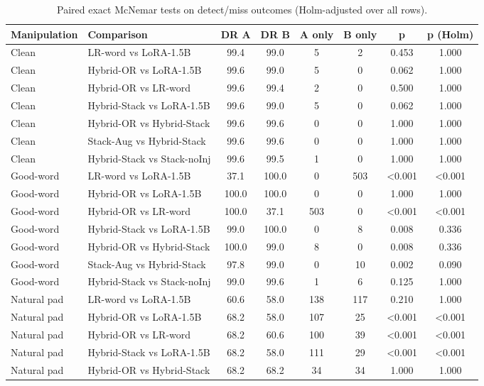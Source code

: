 \begin{table}[t]
\centering
\caption{Paired exact McNemar tests on detect/miss outcomes (Holm-adjusted over all rows).}
\label{tab:mcnemar}
\footnotesize
\begin{tabular}{llcccccc}
\toprule
\textbf{Manipulation} & \textbf{Comparison} & \textbf{DR A} & \textbf{DR B} & \textbf{A only} & \textbf{B only} & \textbf{p} & \textbf{p (Holm)} \\
\midrule
Clean & LR-word vs LoRA-1.5B & 99.4 & 99.0 & 5 & 2 & 0.453 & 1.000 \\
Clean & Hybrid-OR vs LoRA-1.5B & 99.6 & 99.0 & 5 & 0 & 0.062 & 1.000 \\
Clean & Hybrid-OR vs LR-word & 99.6 & 99.4 & 2 & 0 & 0.500 & 1.000 \\
Clean & Hybrid-Stack vs LoRA-1.5B & 99.6 & 99.0 & 5 & 0 & 0.062 & 1.000 \\
Clean & Hybrid-OR vs Hybrid-Stack & 99.6 & 99.6 & 0 & 0 & 1.000 & 1.000 \\
Clean & Stack-Aug vs Hybrid-Stack & 99.6 & 99.6 & 0 & 0 & 1.000 & 1.000 \\
Clean & Hybrid-Stack vs Stack-noInj & 99.6 & 99.5 & 1 & 0 & 1.000 & 1.000 \\
Good-word & LR-word vs LoRA-1.5B & 37.1 & 100.0 & 0 & 503 & <0.001 & <0.001 \\
Good-word & Hybrid-OR vs LoRA-1.5B & 100.0 & 100.0 & 0 & 0 & 1.000 & 1.000 \\
Good-word & Hybrid-OR vs LR-word & 100.0 & 37.1 & 503 & 0 & <0.001 & <0.001 \\
Good-word & Hybrid-Stack vs LoRA-1.5B & 99.0 & 100.0 & 0 & 8 & 0.008 & 0.336 \\
Good-word & Hybrid-OR vs Hybrid-Stack & 100.0 & 99.0 & 8 & 0 & 0.008 & 0.336 \\
Good-word & Stack-Aug vs Hybrid-Stack & 97.8 & 99.0 & 0 & 10 & 0.002 & 0.090 \\
Good-word & Hybrid-Stack vs Stack-noInj & 99.0 & 99.6 & 1 & 6 & 0.125 & 1.000 \\
Natural pad & LR-word vs LoRA-1.5B & 60.6 & 58.0 & 138 & 117 & 0.210 & 1.000 \\
Natural pad & Hybrid-OR vs LoRA-1.5B & 68.2 & 58.0 & 107 & 25 & <0.001 & <0.001 \\
Natural pad & Hybrid-OR vs LR-word & 68.2 & 60.6 & 100 & 39 & <0.001 & <0.001 \\
Natural pad & Hybrid-Stack vs LoRA-1.5B & 68.2 & 58.0 & 111 & 29 & <0.001 & <0.001 \\
Natural pad & Hybrid-OR vs Hybrid-Stack & 68.2 & 68.2 & 34 & 34 & 1.000 & 1.000 \\

\end{tabular}
\end{table}
